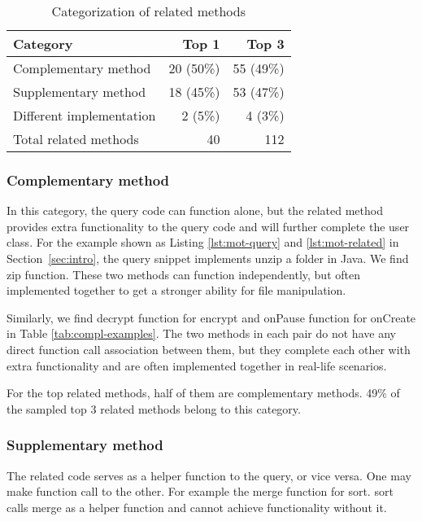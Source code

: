 \begin{table}[h]
	\caption{Categorization of related methods}
	\label{tab:categorization}
	\begin{center}
	\renewcommand{\arraystretch}{1.2}
\renewcommand\tabcolsep{3pt}
		\begin{tabular}{ l|r|r } 
			\hline
			Category & Top 1 & Top 3 \\\hline
			Complementary method &  20 (50\%) & 55 (49\%)\\\hline 
			Supplementary method &  18 (45\%) & 53 (47\%) \\ \hline
			Different implementation &  2 (5\%) & 4 (3\%)\\ \hline
			Total related methods & 40 & 112 \\\hline
		\end{tabular}		
	\end{center}

\end{table}
		

\subsubsection{Complementary method} In this category, the query code can function alone, but the related method provides extra functionality to the query code and will further complete the user class. For the example shown as Listing \ref{lst:mot-query} and \ref{lst:mot-related} in Section~\ref{sec:intro}, the query snippet implements unzip a folder in Java.  We find {\ttt zip} function. These two methods can function independently, but often implemented together to get a stronger ability for file manipulation. 

Similarly, we find {\ttt decrypt} function for {\ttt encrypt} and {\ttt onPause} function for {\ttt onCreate} in Table \ref{tab:compl-examples}. The two methods in each pair do not have any direct function call association between them, but they complete each other with extra functionality and are often implemented together in real-life scenarios. 

For the top related methods, half of them are complementary methods. 49\% of the sampled top 3 related methods belong to this category.

\subsubsection{Supplementary method} The related code serves as a helper function to the query, or vice versa. One may make function call to the other. For example the {\ttt merge} function for {\ttt sort}. {\ttt sort} calls {\ttt merge} as a helper function and cannot achieve functionality without it. 

